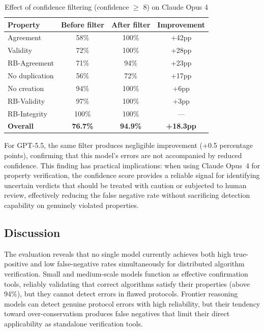 \begin{table}[H]
\centering
\renewcommand{\arraystretch}{1.3}
\caption{Effect of confidence filtering (confidence $\geq$ 8) on Claude Opus 4}
\label{tab:confidence-filter}
\begin{tabular}{|l|c|c|c|}
\hline
\textbf{Property} & \textbf{Before filter} & \textbf{After filter} & \textbf{Improvement} \\
\hline
Agreement & 58\% & 100\% & +42pp \\
Validity & 72\% & 100\% & +28pp \\
RB-Agreement & 71\% & 94\% & +23pp \\
No duplication & 56\% & 72\% & +17pp \\
No creation & 94\% & 100\% & +6pp \\
RB-Validity & 97\% & 100\% & +3pp \\
RB-Integrity & 100\% & 100\% & --- \\
\hline
\textbf{Overall} & \textbf{76.7\%} & \textbf{94.9\%} & \textbf{+18.3pp} \\
\hline
\end{tabular}
\end{table}

For GPT-5.5, the same filter produces negligible improvement (+0.5 percentage points), confirming that this model's errors are not accompanied by reduced confidence. This finding has practical implications: when using Claude Opus~4 for property verification, the confidence score provides a reliable signal for identifying uncertain verdicts that should be treated with caution or subjected to human review, effectively reducing the false negative rate without sacrificing detection capability on genuinely violated properties.

\subsection{Discussion}

The evaluation reveals that no single model currently achieves both high true-positive and low false-negative rates simultaneously for distributed algorithm verification. Small and medium-scale models function as effective confirmation tools, reliably validating that correct algorithms satisfy their properties (above 94\%), but they cannot detect errors in flawed protocols. Frontier reasoning models can detect genuine protocol errors with high reliability, but their tendency toward over-conservatism produces false negatives that limit their direct applicability as standalone verification tools.

